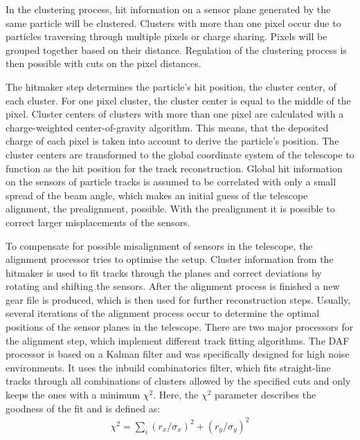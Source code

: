 In the clustering process, hit information on a sensor plane generated by the same particle will be clustered. Clusters with more than one pixel occur due to
particles traversing through multiple pixels or charge sharing. Pixels will be grouped together based on their distance.
Regulation of the clustering process is then possible with cuts on the pixel distances.

The hitmaker step determines the particle's hit position, the cluster center, of each cluster. For one pixel cluster, the cluster center is equal to the middle of
the pixel. Cluster centers of clusters with more than one pixel are calculated with a charge-weighted center-of-gravity algorithm. This means, that
the deposited charge of each pixel is taken into account to derive the particle's position. The cluster centers are transformed to the global coordinate
system of the telescope to function as the hit position for the track reconstruction. Global hit information on the sensors of particle tracks is assumed to be correlated with only
a small spread of the beam angle, which makes an initial guess of the telescope alignment, the prealignment, possible. With the prealignment it is possible
to correct larger misplacements of the sensors.

To compensate for possible misalignment of sensors in the telescope, the alignment processor tries to optimise the setup. Cluster information from the hitmaker
is used to fit tracks through the planes and correct deviations by rotating and shifting the sensors. After the alignment process is finished a new gear file is produced, which
is then used for further reconstruction steps. Usually, several iterations of the alignment process occur to determine the optimal positions of the sensor planes
in the telescope.
There are two major processors for the alignment step, which implement different track fitting algorithms.
The DAF processor is based on a Kalman filter and was specifically designed for high noise environments. It uses the inbuild combinatorics filter, which fits
straight-line tracks through all combinations of clusters allowed by the specified cuts and only keeps the ones with a minimum $\chi^2$. Here, the $\chi^2$ parameter
describes the goodness of the fit and is defined as:
\begin{align} \label{eqn:chi}
  \chi^2 = \sum_i (r_x/\sigma_x)^2 + (r_y/\sigma_y)^2
\end{align}

